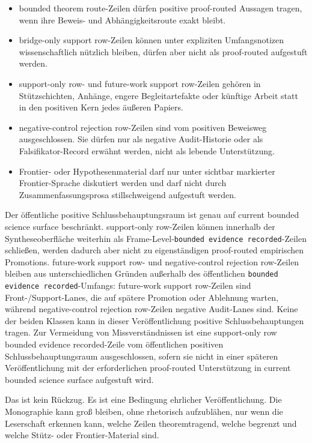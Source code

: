 \begin{itemize}
\item bounded theorem route-Zeilen dürfen positive proof-routed
      Aussagen tragen, wenn ihre Beweis- und Abhängigkeitsroute exakt bleibt.
\item bridge-only support row-Zeilen können unter expliziten Umfangsnotizen
      wissenschaftlich nützlich bleiben, dürfen aber nicht als proof-routed
      aufgestuft werden.
\item support-only row- und future-work support row-Zeilen gehören in
      Stützschichten, Anhänge, engere Begleitartefakte oder künftige Arbeit
      statt in den positiven Kern jedes äußeren Papiers.
\item negative-control rejection row-Zeilen sind vom positiven Beweisweg ausgeschlossen.
      Sie dürfen nur als negative Audit-Historie oder als Falsifikator-Record
      erwähnt werden, nicht als lebende Unterstützung.
\item Frontier- oder Hypothesenmaterial darf nur unter sichtbar markierter
      Frontier-Sprache diskutiert werden und darf nicht durch
      Zusammenfassungsprosa stillschweigend aufgestuft werden.
\end{itemize}

Der öffentliche positive Schlussbehauptungsraum ist genau auf
current bounded science surface beschränkt. support-only row-Zeilen können
innerhalb der Syntheseoberfläche weiterhin als Frame-Level-\texttt{bounded evidence recorded}-Zeilen
schließen, werden dadurch aber nicht zu eigenständigen proof-routed
empirischen Promotions. future-work support row- und negative-control rejection row-Zeilen
bleiben aus unterschiedlichen Gründen außerhalb des öffentlichen
\texttt{bounded evidence recorded}-Umfangs: future-work support row-Zeilen sind Front-/Support-Lanes, die
auf spätere Promotion oder Ablehnung warten, während
negative-control rejection row-Zeilen negative Audit-Lanes sind. Keine der beiden Klassen
kann in dieser Veröffentlichung positive Schlussbehauptungen tragen.
Zur Vermeidung von Missverständnissen ist eine support-only row
bounded evidence recorded-Zeile vom öffentlichen positiven Schlussbehauptungsraum
ausgeschlossen, sofern sie nicht in einer späteren Veröffentlichung mit der
erforderlichen proof-routed Unterstützung in current bounded science surface
aufgestuft wird.

Das ist kein Rückzug. Es ist eine Bedingung ehrlicher Veröffentlichung. Die
Monographie kann groß bleiben, ohne rhetorisch aufzublähen, nur wenn die
Leserschaft erkennen kann, welche Zeilen theoremtragend, welche begrenzt und
welche Stütz- oder Frontier-Material sind.

